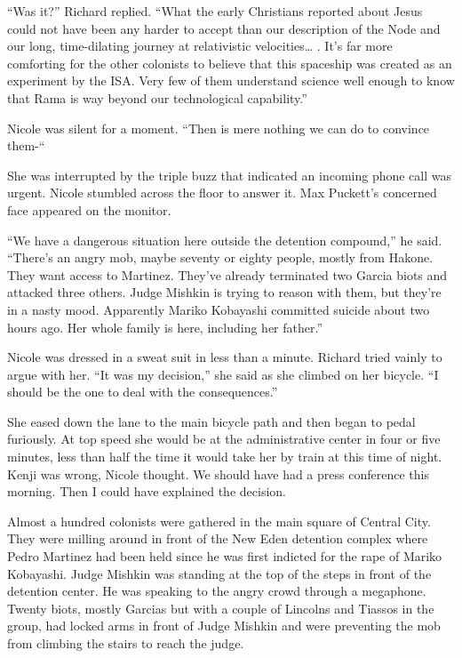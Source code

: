 \documentclass[]{article}
\begin{document}
{“Was it?” Richard replied.  “What the early Christians reported about Jesus could not have been any harder to accept than our description of the Node and our long, time-dilating journey at relativistic velocities… .  It’s far more comforting for the other colonists to believe that this spaceship was created as an experiment by the ISA.  Very few of them understand science well enough to know that Rama is way beyond our technological capability.”

Nicole was silent for a moment.  “Then is mere nothing we can do to convince them-“

She was interrupted by the triple buzz that indicated an incoming phone call was urgent.  Nicole stumbled across the floor to answer it.  Max Puckett’s concerned face appeared on the monitor.

“We have a dangerous situation here outside the detention compound,” he said.  “There’s an angry mob, maybe seventy or eighty people, mostly from Hakone.  They want access to Martinez.  They’ve already terminated two Garcia biots and attacked three others.  Judge Mishkin is trying to reason with them, but they’re in a nasty mood.  Apparently Mariko Kobayashi committed suicide about two hours ago.  Her whole family is here, including her father.”

Nicole was dressed in a sweat suit in less than a minute.  Richard tried vainly to argue with her.  “It was my decision,” she said as she climbed on her bicycle.  “I should be the one to deal with the consequences.”

She eased down the lane to the main bicycle path and then began to pedal furiously.  At top speed she would be at the administrative center in four or five minutes, less than half the time it would take her by train at this time of night.  Kenji was wrong, Nicole thought.  We should have had a press conference this morning.  Then I could have explained the decision.

Almost a hundred colonists were gathered in the main square of Central City.  They were milling around in front of the New Eden detention complex where Pedro Martinez had been held since he was first indicted for the rape of Mariko Kobayashi.  Judge Mishkin was standing at the top of the steps in front of the detention center.  He was speaking to the angry crowd through a megaphone.  Twenty biots, mostly Garcias but with a couple of Lincolns and Tiassos in the group, had locked arms in front of Judge Mishkin and were preventing the mob from climbing the stairs to reach the judge.

}
\end{document}
